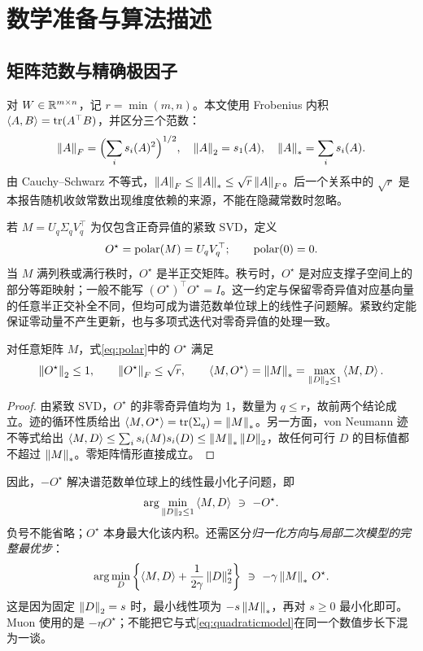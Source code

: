 \section{数学准备与算法描述}
\subsection{矩阵范数与精确极因子}
对 $W\in\mathbb R^{m\times n}$，记 $r=\min(m,n)$。本文使用 Frobenius 内积
$\left\langle A,B\right\rangle=\operatorname{tr}(A^\top B)$，并区分三个范数：
\begin{equation}
 \left\lVert A\right\rVert_F=\Bigl(\sum_i s_i(A)^2\Bigr)^{1/2},\quad
 \left\lVert A\right\rVert_2=s_1(A),\quad \left\lVert A\right\rVert_*=\sum_i s_i(A).
\end{equation}
由 Cauchy--Schwarz 不等式，$\left\lVert A\right\rVert_F\leq\left\lVert A\right\rVert_*\leq\sqrt r\left\lVert A\right\rVert_F$。后一个关系中的 $\sqrt r$ 是本报告随机收敛常数出现维度依赖的来源，不能在隐藏常数时忽略。

若 $M=U_q\Sigma_qV_q^\top$ 为仅包含正奇异值的紧致 SVD，定义
\begin{equation}\label{eq:polar}
 O^\star=\operatorname{polar}(M)=U_qV_q^\top;\qquad \operatorname{polar}(0)=0.
\end{equation}
当 $M$ 满列秩或满行秩时，$O^\star$ 是半正交矩阵。秩亏时，$O^\star$ 是对应支撑子空间上的部分等距映射；一般不能写 $(O^\star)^\top O^\star=I$。这一约定与保留零奇异值对应基向量的任意半正交补全不同，但均可成为谱范数单位球上的线性子问题解。紧致约定能保证零动量不产生更新，也与多项式迭代对零奇异值的处理一致。

\begin{lemma}[对偶关系与方向性质]\label{lem:duality}
对任意矩阵 $M$，式\eqref{eq:polar}中的 $O^\star$ 满足
\begin{equation}\label{eq:dual}
 \left\lVert O^\star\right\rVert_2\leq1,\qquad \left\lVert O^\star\right\rVert_F\leq\sqrt r,\qquad
 \left\langle M,O^\star\right\rangle=\left\lVert M\right\rVert_*=\max_{\left\lVert D\right\rVert_2\leq1}\left\langle M,D\right\rangle.
\end{equation}
\end{lemma}
\begin{proof}
由紧致 SVD，$O^\star$ 的非零奇异值均为 1，数量为 $q\leq r$，故前两个结论成立。迹的循环性质给出 $\left\langle M,O^\star\right\rangle=\operatorname{tr}(\Sigma_q)=\left\lVert M\right\rVert_*$。另一方面，von Neumann 迹不等式给出
$\left\langle M,D\right\rangle\leq\sum_i s_i(M)s_i(D)\leq\left\lVert M\right\rVert_*\left\lVert D\right\rVert_2$，故任何可行 $D$ 的目标值都不超过 $\left\lVert M\right\rVert_*$。零矩阵情形直接成立。
\end{proof}

因此，$-O^\star$ 解决谱范数单位球上的线性最小化子问题，即
\begin{equation}
 \arg\min_{\|D\|_2\leq1}\inner{M}{D}\ \ni\ -O^\star.
\end{equation}
负号不能省略；$O^\star$ 本身最大化该内积。还需区分\emph{归一化方向}与\emph{局部二次模型的完整最优步}：
\begin{equation}\label{eq:quadraticmodel}
 \arg\min_D\left\{\left\langle M,D\right\rangle+\frac{1}{2\gamma}\left\lVert D\right\rVert_2^2\right\}
 \ \ni\ -\gamma\left\lVert M\right\rVert_*\,O^\star.
\end{equation}
这是因为固定 $\left\lVert D\right\rVert_2=s$ 时，最小线性项为 $-s\left\lVert M\right\rVert_*$，再对 $s\geq0$ 最小化即可。Muon 使用的是 $-\eta O^\star$；不能把它与式\eqref{eq:quadraticmodel}在同一个数值步长下混为一谈。

